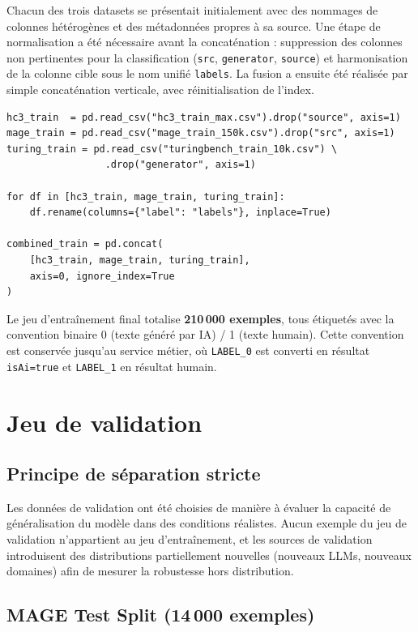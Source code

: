 ﻿\documentclass[12pt, a4paper]{report}
\begin{document}
Chacun des trois datasets se présentait initialement avec des nommages de colonnes
hétérogènes et des métadonnées propres à sa source. Une étape de normalisation a
été nécessaire avant la concaténation : suppression des colonnes non pertinentes
pour la classification (\texttt{src}, \texttt{generator}, \texttt{source}) et
harmonisation de la colonne cible sous le nom unifié \texttt{labels}. La fusion
a ensuite été réalisée par simple concaténation verticale, avec réinitialisation
de l'index.

\begin{verbatim}
hc3_train  = pd.read_csv("hc3_train_max.csv").drop("source", axis=1)
mage_train = pd.read_csv("mage_train_150k.csv").drop("src", axis=1)
turing_train = pd.read_csv("turingbench_train_10k.csv") \
                 .drop("generator", axis=1)

for df in [hc3_train, mage_train, turing_train]:
    df.rename(columns={"label": "labels"}, inplace=True)

combined_train = pd.concat(
    [hc3_train, mage_train, turing_train],
    axis=0, ignore_index=True
)
\end{verbatim}

Le jeu d'entraînement final totalise \textbf{210\,000 exemples}, tous étiquetés
avec la convention binaire 0 (texte généré par IA) / 1 (texte humain). Cette
convention est conservée jusqu'au service métier, où \texttt{LABEL\_0} est
converti en résultat \texttt{isAi=true} et \texttt{LABEL\_1} en résultat humain.

\section{Jeu de validation}

\subsection{Principe de séparation stricte}

Les données de validation ont été choisies de manière à évaluer la capacité de
généralisation du modèle dans des conditions réalistes. Aucun exemple du jeu de
validation n'appartient au jeu d'entraînement, et les sources de validation
introduisent des distributions partiellement nouvelles (nouveaux LLMs, nouveaux
domaines) afin de mesurer la robustesse hors distribution.

\subsection{MAGE Test Split (14\,000 exemples)}
\end{document}
